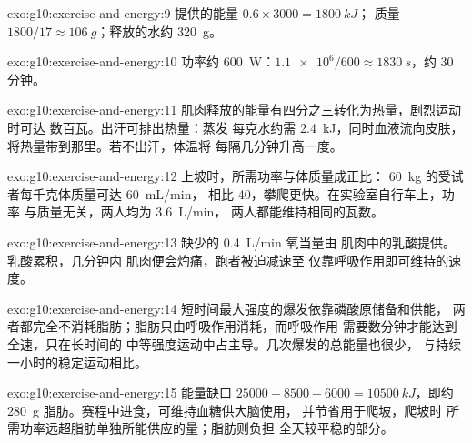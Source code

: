\begin{solution}{exo:g10:exercise-and-energy:9}
提供的能量 $0.6 \times 3000 = \qty{1800}{kJ}$；
质量 $1800/17 \approx \qty{106}{g}$；释放的水约 \qty{320}{g}。
\end{solution}

\begin{solution}{exo:g10:exercise-and-energy:10}
功率约 \qty{600}{W}：$\num{1.1e6}/600 \approx
\qty{1830}{s}$，约 30 分钟。
\end{solution}

\begin{solution}{exo:g10:exercise-and-energy:11}
肌肉释放的能量有四分之三转化为热量，剧烈运动时可达
数百瓦。出汗可排出热量：蒸发
每克水约需 \qty{2.4}{kJ}，同时血液流向皮肤，
将热量带到那里。若不出汗，体温将
每隔几分钟升高一度。
\end{solution}

\begin{solution}{exo:g10:exercise-and-energy:12}
上坡时，所需功率与体质量成正比：
\qty{60}{kg} 的受试者每千克体质量可达 \qty{60}{mL/min}，
相比 \num{40}，攀爬更快。在实验室自行车上，功率
与质量无关，两人均为 \qty{3.6}{L/min}，
两人都能维持相同的瓦数。
\end{solution}

\begin{solution}{exo:g10:exercise-and-energy:13}
缺少的 \qty{0.4}{L/min} 氧当量由
肌肉中的乳酸提供。乳酸累积，几分钟内
肌肉便会灼痛，跑者被迫减速至
仅靠呼吸作用即可维持的速度。
\end{solution}

\begin{solution}{exo:g10:exercise-and-energy:14}
短时间最大强度的爆发依靠磷酸原储备和供能，
两者都完全不消耗脂肪；脂肪只由呼吸作用消耗，而呼吸作用
需要数分钟才能达到全速，只在长时间的
中等强度运动中占主导。几次爆发的总能量也很少，
与持续一小时的稳定运动相比。
\end{solution}

\begin{solution}{exo:g10:exercise-and-energy:15}
能量缺口 $25000 - 8500 - 6000 = \qty{10500}{kJ}$，即约
\qty{280}{g} 脂肪。赛程中进食，可维持血糖供大脑使用，
并节省用于爬坡，爬坡时
所需功率远超脂肪单独所能供应的量；脂肪则负担
全天较平稳的部分。
\end{solution}

